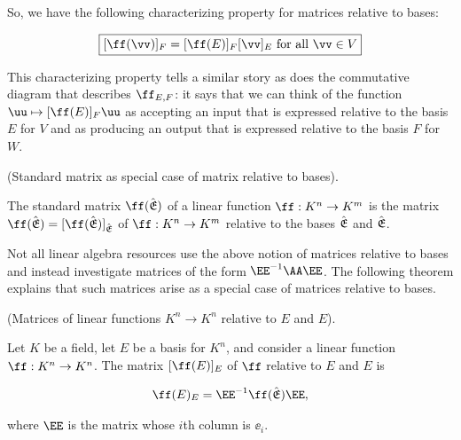 \begin{deriv}
    So, we have the following characterizing property for matrices relative to bases:
    
    \begin{align*}
        \boxed
        {
            [\ff(\vv)]_F = [\ff(E)]_F [\vv]_E \text{ for all $\vv \in V$}
        }
    \end{align*}
    
    This characterizing property tells a similar story as does the commutative diagram that describes $\ff_{E,F}$: it says that we can think of the function $\uu \mapsto [\ff(E)]_F \uu$ as accepting an input that is expressed relative to the basis $E$ for $V$ and as producing an output that is expressed relative to the basis $F$ for $W$.
\end{deriv}

\begin{remark}
\label{ch::lin_alg::rmk::standard_matrix_as_matrix_wrt_bases}
    (Standard matrix as special case of matrix relative to bases). 
    
    The standard matrix $\ff(\sE)$ of a linear function $\ff:K^n \rightarrow K^m$ is the matrix $\ff(\sE) = [\ff(\sE)]_\sE$ of $\ff:K^n \rightarrow K^m$ relative to the bases ${\hat{\mathfrak{E}}}$ and ${\hat{\mathfrak{E}}}$.
\end{remark}

Not all linear algebra resources use the above notion of matrices relative to bases and instead investigate matrices of the form $\EE^{-1} \AA \EE$. The following theorem explains that such matrices arise as a special case of matrices relative to bases.

\begin{theorem}
    (Matrices of linear functions $K^n \rightarrow K^n$ relative to $E$ and $E$).
    
    Let $K$ be a field, let $E$ be a basis for $K^n$, and consider a linear function $\ff:K^n \rightarrow K^n$. The matrix $[\ff(E)]_E$ of $\ff$ relative to $E$ and $E$ is
    
    \begin{align*}
        \ff(E)_E = \EE^{-1} \ff(\sE) \EE,
    \end{align*}
    
    where $\EE$ is the matrix whose $i$th column is $\ee_i$.
\end{theorem}

